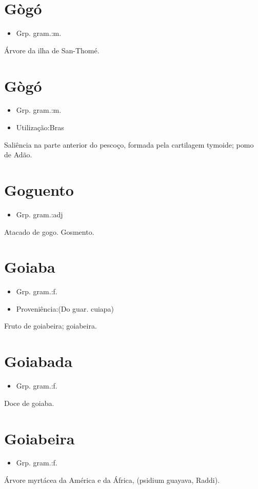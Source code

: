 \section{Gògó}
\begin{itemize}
\item {Grp. gram.:m.}
\end{itemize}
Árvore da ilha de San-Thomé.
\section{Gògó}
\begin{itemize}
\item {Grp. gram.:m.}
\end{itemize}
\begin{itemize}
\item {Utilização:Bras}
\end{itemize}
Saliência na parte anterior do pescoço, formada pela cartilagem tymoide; pomo de Adão.
\section{Goguento}
\begin{itemize}
\item {Grp. gram.:adj}
\end{itemize}
Atacado de gogo.
Gosmento.
\section{Goiaba}
\begin{itemize}
\item {Grp. gram.:f.}
\end{itemize}
\begin{itemize}
\item {Proveniência:(Do guar. \textunderscore cuiapa\textunderscore )}
\end{itemize}
Fruto de goiabeira; goiabeira.
\section{Goiabada}
\begin{itemize}
\item {Grp. gram.:f.}
\end{itemize}
Doce de goiaba.
\section{Goiabeira}
\begin{itemize}
\item {Grp. gram.:f.}
\end{itemize}
Árvore myrtácea da América e da África, (\textunderscore psidium guayava\textunderscore , Raddi).
